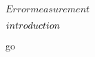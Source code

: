 \documentclass[../Main/main]{subfiles}
\begin{document}
\unit{ $ Error measurement $ }
{
	\introduction
	{ 
		$introduction\\$ 
	}

	go

}
\end{document}
